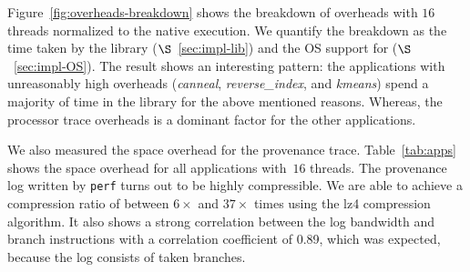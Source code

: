  Figure~\ref{fig:overheads-breakdown} shows the breakdown of overheads with $16$ threads normalized to the native \pthreads execution. We quantify the breakdown as the time taken by the \projecttitle library ($\S$~\ref{sec:impl-lib}) and the OS support for \intelpt  ($\S$~\ref{sec:impl-OS}). The result shows an interesting pattern: the applications with unreasonably high overheads ({\em canneal}, {\em reverse\_index}, and {\em kmeans}) spend a majority of time in the \projecttitle library for the above mentioned reasons. Whereas, the processor trace overheads is a dominant factor for the other applications.%





 We also measured the space overhead for the provenance trace. Table~\ref{tab:apps} shows the space overhead for all applications with~$16$ threads. The provenance log written by {\tt perf} turns out to be highly compressible. We
are able to achieve a compression ratio of between $6\times$ and $37\times$ times using the lz4 compression algorithm.
It also shows a strong correlation between the log bandwidth and branch instructions with a correlation coefficient of 0.89, which was expected, because the
log consists of taken branches.



